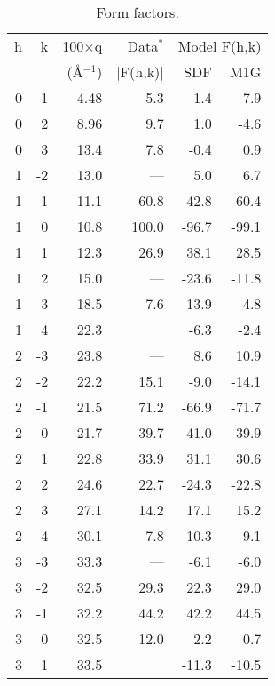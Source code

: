 
\begin{table}
\begin{center}
\caption{Form factors.
\label{formfactor}}
\vspace{6pt}
{\tabcolsep=0.3in
\begin{tabular}{rrrrrr} 
\\ \hline 
h & k & 100$\times$q & Data$^{*}$ &
        \multicolumn{2}{c}{Model F(h,k)} \\ \cline{5-6}
& & (\AA$^{-1}$) & $|$F(h,k)$|$ & SDF & M1G \\ \hline
0 &  1 & 4.48  &  5.3  &  -1.4  &  7.9  \\
0 &  2 & 8.96  & 9.7  &  1.0  &  -4.6 \\
0 &  3 & 13.4  &  7.8  &  -0.4   &  0.9 \\
1 &  -2 & 13.0  &  ---  &  5.0  &  6.7   \\
1 &  -1 & 11.1  &  60.8  &  -42.8  &  -60.4 \\
1 &   0 & 10.8  &  100.0  &  -96.7  &  -99.1 \\
1 &   1 & 12.3  &  26.9  &  38.1  &  28.5 \\
1 &   2 & 15.0  &  ---  &  -23.6  &  -11.8 \\
1 &   3 & 18.5  &  7.6  &  13.9  &  4.8 \\
1 &   4 & 22.3  &  ---  &  -6.3  &  -2.4 \\
2 &  -3 & 23.8  &  ---  &  8.6  &  10.9 \\
2 &  -2 & 22.2  &  15.1  &  -9.0  &  -14.1 \\
2 &  -1 & 21.5  &  71.2  &  -66.9  &  -71.7 \\
2 &   0 & 21.7  &  39.7  &  -41.0  &  -39.9 \\
2 &   1 & 22.8  &  33.9  &  31.1  &  30.6 \\
2 &   2 & 24.6  &  22.7  &  -24.3  &  -22.8 \\
2 &   3 & 27.1  &  14.2  &  17.1  &  15.2 \\
2 &   4 & 30.1  &  7.8  &  -10.3  &  -9.1 \\
3 &  -3 & 33.3  &  ---  &  -6.1  &  -6.0 \\
3 &  -2 & 32.5  &  29.3  &  22.3  &  29.0 \\
3 &  -1 & 32.2  &  44.2  &  42.2  &  44.5 \\
3 &   0 & 32.5  &  12.0    &  2.2  &  0.7   \\
3 &   1 & 33.5  &  ---  &  -11.3  &  -10.5 \\

\end{tabular}}
\end{center}
\end{table}
